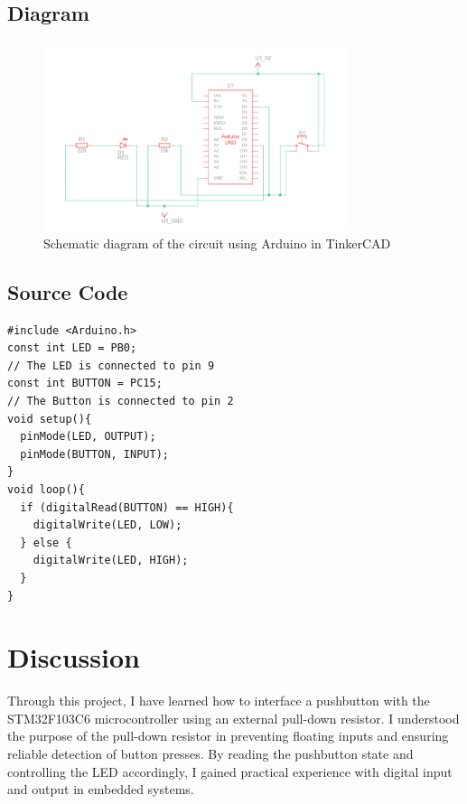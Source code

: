 \subsection{Diagram}
\begin{figure}[htbp]
    \centering
    \includegraphics[width=0.8\textwidth]{img/pushbtn.png}
    \caption{Schematic diagram of the circuit using Arduino in TinkerCAD}\label{fig:sim}
\end{figure}
\subsection{Source Code}
\begin{code}
\caption{Controlling an LED using pushbutton}
\begin{verbatim}
#include <Arduino.h>
const int LED = PB0;
// The LED is connected to pin 9
const int BUTTON = PC15;
// The Button is connected to pin 2
void setup(){
  pinMode(LED, OUTPUT);
  pinMode(BUTTON, INPUT);
}
void loop(){
  if (digitalRead(BUTTON) == HIGH){
    digitalWrite(LED, LOW);
  } else {
    digitalWrite(LED, HIGH);
  }
}
\end{verbatim}
    \label{code:pushbutton}
\end{code}

\section{Discussion}

Through this project, I have learned how to interface a pushbutton with the STM32F103C6 microcontroller using an external pull-down resistor. I understood the purpose of the pull-down resistor in preventing floating inputs and ensuring reliable detection of button presses.
By reading the pushbutton state and controlling the LED accordingly, I gained practical experience with digital input and output in embedded systems.
